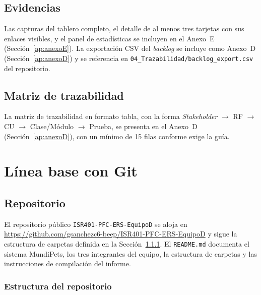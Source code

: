 \documentclass[journal,onecolumn]{IEEEtran}
\begin{document}
	\subsection{Evidencias}
	
	Las capturas del tablero completo, el detalle de al menos tres
	tarjetas con sus enlaces visibles, y el panel de estadísticas se
	incluyen en el Anexo~E (Sección~\ref{ap:anexoE}). La exportación
	CSV del \emph{backlog} se incluye como Anexo~D
	(Sección~\ref{ap:anexoD}) y se referencia en
	\texttt{04\_Trazabilidad/backlog\_export.csv} del repositorio.
	
	\subsection{Matriz de trazabilidad}
	
	La matriz de trazabilidad en formato tabla, con la forma
	\emph{Stakeholder} $\rightarrow$ RF $\rightarrow$ CU $\rightarrow$
	Clase/Módulo $\rightarrow$ Prueba, se presenta en el Anexo~D
	(Sección~\ref{ap:anexoD}), con un mínimo de 15 filas conforme
	exige la guía.
	
	\section{Línea base con Git}
	\label{sec:git}
	
	\subsection{Repositorio}
	
	El repositorio público \texttt{ISR401-PFC-ERS-EquipoD} se aloja en
	\url{https://github.com/gsanchezc6-beep/ISR401-PFC-ERS-EquipoD} y
	sigue la estructura de carpetas definida en la
	Sección~\ref{sec:estructura-repo}. El \texttt{README.md} documenta
	el sistema MundiPets, los tres integrantes del equipo, la
	estructura de carpetas y las instrucciones de compilación del
	informe.
	
	\subsubsection{Estructura del repositorio}
	\label{sec:estructura-repo}
	
\end{document}
